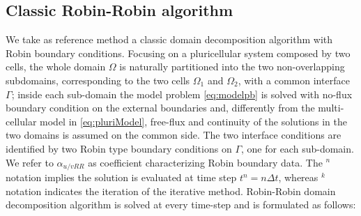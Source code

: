 \subsection{Classic Robin-Robin algorithm}\label{sec:RRclassic}
We take as reference method a classic domain decomposition algorithm with Robin boundary conditions. Focusing on a pluricellular system composed by two cells, the whole domain $\Omega$ is naturally partitioned into the two non-overlapping subdomains, corresponding to the two cells $\Omega_1$ and $\Omega_2$, with a common interface $\Gamma$; inside each sub-domain the model problem \eqref{eq:modelpb} is solved with no-flux boundary condition on the external boundaries and, differently from the multi-cellular model in \eqref{eq:pluriModel}, free-flux and continuity of the solutions in the two domains is assumed on the common side. The two interface conditions are identified by two Robin type boundary conditions on $\Gamma$, one for each sub-domain. We refer to $\alpha_{u/v RR}$ as coefficient characterizing Robin boundary data. The $^n$ notation implies the solution is evaluated at time step $t^n = n \Delta t$, whereas $^k$ notation indicates the iteration of the iterative method. Robin-Robin domain decomposition algorithm is solved at every time-step and is formulated as follows:

